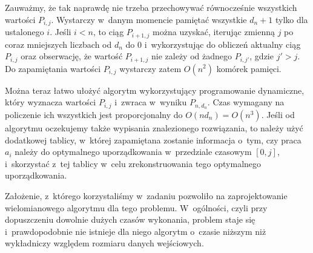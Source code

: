 Zauważmy, że tak naprawdę nie trzeba przechowywać równocześnie wszystkich wartości $P_{i,j}$.
Wystarczy w~danym momencie pamiętać wszystkie $d_n+1$ tylko dla ustalonego $i$.
Jeśli $i<n$, to ciąg $P_{i+1,j}$ można uzyskać, iterując zmienną $j$ po coraz mniejszych liczbach od $d_n$ do 0 i~wykorzystując do obliczeń aktualny ciąg $P_{i,j}$ oraz obserwację, że wartość $P_{i+1,j}$ nie zależy od żadnego $P_{i,j'}$, gdzie $j'>j$.
Do zapamiętania wartości $P_{i,j}$ wystarczy zatem $O(n^2)$ komórek pamięci.

Można teraz łatwo ułożyć algorytm wykorzystujący programowanie dynamiczne, który wyznacza wartości $P_{i,j}$ i~zwraca w~wyniku $P_{n,d_n}$\!.
Czas wymagany na policzenie ich wszystkich jest proporcjonalny do $O(nd_n)=O(n^3)$.
Jeśli od algorytmu oczekujemy także wypisania znalezionego rozwiązania, to należy użyć dodatkowej tablicy, w~której zapamiętana zostanie informacja o~tym, czy praca $a_i$ należy do optymalnego uporządkowania w~przedziale czasowym $[0,j]$, i~skorzystać z~tej tablicy w~celu zrekonstruowania tego optymalnego uporządkowania.

Założenie, z~którego korzystaliśmy w~zadaniu pozwoliło na zaprojektowanie wielomianowego algorytmu dla tego problemu.
W~ogólności, czyli przy dopuszczeniu dowolnie dużych czasów wykonania, problem staje się  i~prawdopodobnie nie istnieje dla niego algorytm o~czasie niższym niż wykładniczy względem rozmiaru danych wejściowych.
